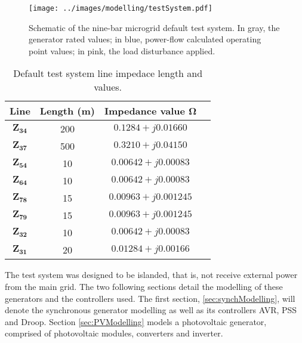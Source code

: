 \begin{figure}[htb]
	\begin{center}
		\texttt{[image: ../images/modelling/testSystem.pdf]}
		\caption[Schematic of the nine-bar microgrid default test system.]{Schematic of the nine-bar microgrid default test system. In gray, the generator rated values; in blue, power-flow calculated operating point values; in pink, the load disturbance applied.}
		\label{fig:testSystem}
	\end{center}
\end{figure}

\begingroup
\renewcommand*{\arraystretch}{1.3}
\renewcommand*{\tabcolsep}{2mm}
\begin{table}[h]
	\begin{center}
		\begin{tabular}{c c c c}
			\hline
			\textbf{Line} & \textbf{Length (m)} & \textbf{Impedance value} $\mathbf{\Omega}$ \\
			\hline
			$\mathbf{Z_{34}}$ & 200  & $0.1284 + j0.01660$ \\
			\hline
			$\mathbf{Z_{37}}$ & 500  & $0.3210 + j0.04150$ \\
			\hline
			$\mathbf{Z_{54}}$ & 10  & $0.00642 + j0.00083$ \\
			\hline
			$\mathbf{Z_{64}}$ & 10  & $0.00642 + j0.00083$ \\
			\hline
			$\mathbf{Z_{78}}$ & 15  & $0.00963 + j0.001245$ \\
			\hline
			$\mathbf{Z_{79}}$ & 15  & $0.00963 + j0.001245$ \\
			\hline
			$\mathbf{Z_{32}}$ & 10  & $0.00642 + j0.00083$ \\
			\hline
			$\mathbf{Z_{31}}$ & 20  & $0.01284 + j0.00166$ \\
			\hline
		\end{tabular}
		\caption{Default test system line impedace length and values.}
		\label{tab:lineImpedances}
	\end{center}
\end{table}
\endgroup %

	The test system was designed to be islanded, that is, not receive external power from the main  grid. The two following sections detail the modelling of these generators and the controllers used. The first section, \ref{sec:synchModelling}, will denote the synchronous generator modelling as well as its controllers AVR, PSS and Droop. Section \ref{sec:PVModelling} models a photovoltaic generator, comprised of photovoltaic modules, converters and inverter.

